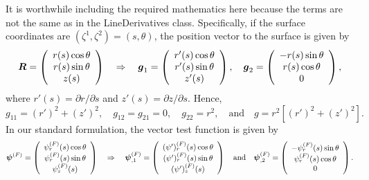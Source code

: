 It is worthwhile including the required mathematics here because the terms are not the same as in the {\ttfamily Line\+Derivatives} class. Specifically, if the surface coordinates are $ (\zeta^{1}, \zeta^{2}) = (s,\theta)$, the position vector to the surface is given by \[ \mbox{\boldmath$R$} = \left(\begin{array}{c} r(s)\cos\theta \\ r(s)\sin\theta \\ z(s) \end{array}\right) \quad\Rightarrow\quad \mbox{\boldmath$g$}_{1} = \left(\begin{array}{c} r'(s)\cos\theta \\ r'(s)\sin\theta \\ z'(s) \end{array}\right), \quad \mbox{\boldmath$g$}_{2} = \left(\begin{array}{c} -r(s)\sin\theta \\ r(s)\cos\theta \\ 0 \end{array}\right), \] where $ r'(s) = \partial r / \partial s$ and $ z'(s) = \partial z / \partial s$. Hence, \[ g_{11} = (r')^{2} + (z')^{2}, \quad g_{12} = g_{21} = 0, \quad g_{22} = r^{2}, \quad\mbox{and}\quad g = r^{2} \left[(r')^{2} + (z')^{2}\right].\] In our standard formulation, the vector test function is given by \[ \mbox{\boldmath$\psi$}^{(F)} = \left(\begin{array}{c} \psi_{r}^{(F)}(s) \cos\theta \\ \psi_{r}^{(F)}(s) \sin\theta \\ \psi_{z}^{(F)}(s) \end{array} \right) \quad\Rightarrow\quad \mbox{\boldmath$\psi$}^{(F)}_{,1} = \left(\begin{array}{c} (\psi')_{r}^{(F)}(s) \cos\theta \\ (\psi')_{r}^{(F)}(s) \sin\theta \\ (\psi')_{z}^{(F)}(s) \end{array} \right) \quad\mbox{and}\quad \mbox{\boldmath$\psi$}^{(F)}_{,2} = \left(\begin{array}{c} -\psi_{r}^{(F)}(s) \sin\theta \\ \psi_{r}^{(F)}(s) \cos\theta \\ 0 \end{array} \right).\]

